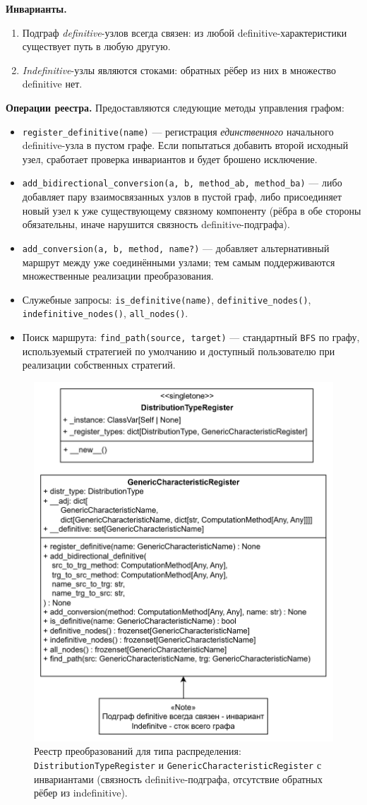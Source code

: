 \textbf{Инварианты.}
\begin{enumerate}
  \item Подграф \emph{definitive}-узлов всегда связен: из любой definitive-характеристики существует путь в любую другую.
  \item \emph{Indefinitive}-узлы являются стоками: обратных рёбер из них в множество definitive нет.
\end{enumerate}

\textbf{Операции реестра.}
Предоставляются следующие методы управления графом:
\begin{itemize}
  \item \texttt{register\_definitive(name)} — регистрация \emph{единственного} начального definitive-узла в пустом графе. Если попытаться добавить второй исходный узел, сработает проверка инвариантов и будет брошено исключение.
  \item \texttt{add\_bidirectional\_conversion(a, b, method\_ab, method\_ba)} — либо добавляет пару взаимосвязанных узлов в пустой граф, либо присоединяет новый узел к уже существующему связному компоненту (рёбра в обе стороны обязательны, иначе нарушится связность definitive-подграфа).
  \item \texttt{add\_conversion(a, b, method, name?)} — добавляет альтернативный маршрут между уже соединёнными узлами; тем самым поддерживаются множественные реализации преобразования.
  \item Служебные запросы: \texttt{is\_definitive(name)}, \texttt{definitive\_nodes()}, \texttt{indefinitive\_nodes()}, \texttt{all\_nodes()}.
  \item Поиск маршрута: \texttt{find\_path(source, target)} — стандартный \texttt{BFS} по графу, используемый стратегией по умолчанию и доступный пользователю при реализации собственных стратегий.
\end{itemize}

\begin{figure}[htbp]
  \centering
  \includegraphics[width=0.5\linewidth]{assets/images/Register.png}
  \caption{Реестр преобразований для типа распределения: \texttt{DistributionTypeRegister}
  и \texttt{GenericCharacteristicRegister} с инвариантами (связность definitive-подграфа,
  отсутствие обратных рёбер из indefinitive).}
  \label{fig:uml-register}
\end{figure}